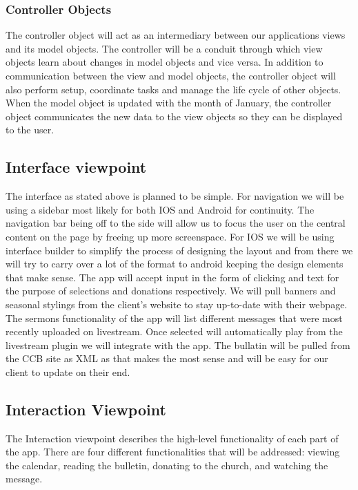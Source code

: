 \documentclass[letterpaper,10pt,draftclsnofoot,onecolumn,titlepage]{IEEEtran}
\begin{document}
			\subsubsection{Controller Objects}
				The controller object will act as an intermediary between our applications views and its model objects.
				The controller will be a conduit through which view objects learn about changes in model objects and vice versa.
				In addition to communication between the view and model objects, the controller object will also perform setup, coordinate tasks and manage the life cycle of other objects.
				When the model object is updated with the month of January, the controller object communicates the new data to the view objects so they can be displayed to the user.


		\subsection{Interface viewpoint}
			The interface as stated above is planned to be simple.
			For navigation we will be using a sidebar most likely for both IOS and Android for continuity.
			The navigation bar being off to the side will allow us to focus the user on the central content on the page by freeing up more screenspace. 
			For IOS we will be using interface builder to simplify the process of designing the layout and from there we will try to carry over a lot of the format to android keeping the design elements that make sense.
			The app will accept input in the form of clicking and text for the purpose of selections and donations respectively.
			We will pull banners and seasonal stylings from the client’s website to stay up-to-date with their webpage.
			The sermons functionality of the app will list different messages that were most recently uploaded on livestream.
			Once selected will automatically play from the livestream plugin we will integrate with the app.
			The bullatin will be pulled from the CCB site as XML as that makes the most sense and will be easy for our client to update on their end.


		\subsection{Interaction Viewpoint}
			The Interaction viewpoint describes the high-level functionality of each part of the app.
			There are four different functionalities that will be addressed: viewing the calendar, reading the bulletin, donating to the church, and watching the message.
\end{document}
